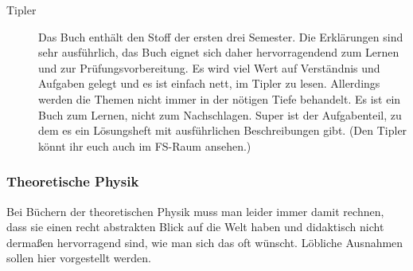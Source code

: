 \begin{description}

\item[Tipler]{
Das Buch enthält den Stoff der ersten drei Semester. Die Erklärungen
sind
sehr ausführlich, das Buch eignet sich daher hervorragendend zum
Lernen und
zur Prüfungsvorbereitung. Es wird viel Wert auf Verständnis und
Aufgaben
gelegt und es ist einfach nett, im Tipler zu lesen. Allerdings werden
die
Themen nicht immer in der nötigen Tiefe behandelt. Es ist ein
Buch zum Lernen, nicht zum Nachschlagen. Super ist der Aufgabenteil,
zu dem es
ein Lösungsheft mit ausführlichen Beschreibungen gibt. (Den Tipler
könnt ihr euch auch
im FS-Raum ansehen.)}

\end{description}

\subsubsection*{Theoretische Physik}

Bei Büchern der theoretischen Physik muss man leider immer damit rechnen, dass
sie einen recht abstrakten Blick auf die Welt haben und didaktisch nicht
dermaßen hervorragend sind, wie man sich das oft wünscht. Löbliche Ausnahmen
sollen hier vorgestellt werden.

